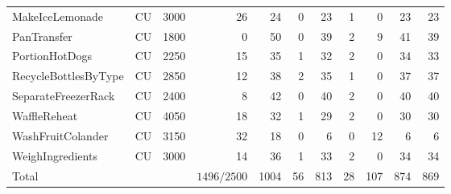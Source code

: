 \begin{longtable}{@{}lcrrrrrrrrr@{}}
MakeIceLemonade & CU & 3000 & 26 & 24 & 0 & 23 & 1 & 0 & 23 & 23 \\
PanTransfer & CU & 1800 & 0 & 50 & 0 & 39 & 2 & 9 & 41 & 39 \\
PortionHotDogs & CU & 2250 & 15 & 35 & 1 & 32 & 2 & 0 & 34 & 33 \\
RecycleBottlesByType & CU & 2850 & 12 & 38 & 2 & 35 & 1 & 0 & 37 & 37 \\
SeparateFreezerRack & CU & 2400 & 8 & 42 & 0 & 40 & 2 & 0 & 40 & 40 \\
WaffleReheat & CU & 4050 & 18 & 32 & 1 & 29 & 2 & 0 & 30 & 30 \\
WashFruitColander & CU & 3150 & 32 & 18 & 0 & 6 & 0 & 12 & 6 & 6 \\
WeighIngredients & CU & 3000 & 14 & 36 & 1 & 33 & 2 & 0 & 34 & 34 \\
\midrule
Total & & & $1496/2500$ & 1004 & 56 & 813 & 28 & 107 & 874 & 869 \\
\end{longtable}
\endgroup
